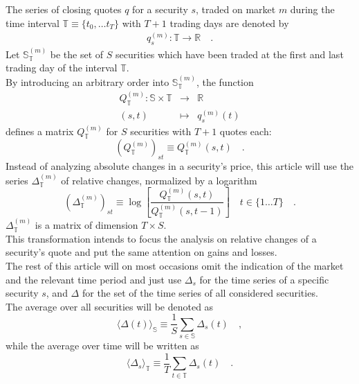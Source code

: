 \documentclass[11pt,twoside,a4paper]{article}
\numberwithin{equation}{section}
\numberwithin{figure}{section}
\numberwithin{table}{section}
\begin{document}
The series of closing quotes $q$ for a security $s$, traded on market $m$ during the time interval $\mathbb{T}\equiv\{t_0,\ldots t_T\}$ with $T+1$ trading days are denoted by
\begin{align}
q^{(m)}_{s}:\mathbb{T}\rightarrow\mathbb{R}\quad.
\label{eqDefQuoteSeries}
\end{align}
Let $\mathbb{S}^{(m)}_\mathbb{T}$ be the set of $S$ securities which have been traded at the first and last trading day of the interval $\mathbb{T}$.\\
By introducing an arbitrary order into $\mathbb{S}^{(m)}_\mathbb{T}$, the function
\begin{eqnarray}
Q^{(m)}_{\mathbb{T}}:\mathbb{S}\times\mathbb{T}&\rightarrow&\mathbb{R}\\
(s,t)&\mapsto&q^{(m)}_s(t)
\end{eqnarray}
defines a matrix $Q^{(m)}_{\mathbb{T}}$ for $S$ securities with $T+1$ quotes each:
\begin{equation}
(Q^{(m)}_{\mathbb{T}})_{st}\equiv Q^{(m)}_{\mathbb{T}}(s,t)\quad.
\end{equation}
Instead of analyzing absolute changes in a security's price, this article will use the series $\Delta^{(m)}_{\mathbb{T}}$ of relative changes, normalized by a logarithm 
\begin{equation}
\left(\Delta^{(m)}_{\mathbb{T}}\right)_{st} \equiv \log\left[\frac{Q^{(m)}_{\mathbb{T}}(s,t)}{Q^{(m)}_{\mathbb{T}}(s,t-1)}\right]\quad t\in\{1\ldots T\}\quad.
\end{equation}
$\Delta^{(m)}_{\mathbb{T}}$ is a matrix of dimension $T\times S$.\\

This transformation intends to focus the analysis on relative changes of a security's quote and put the same attention on gains and losses.\\
The rest of this article will on most occasions omit the indication of the market and the relevant time period and just use $\Delta_s$ for the time series of a specific security $s$, and $\Delta$ for the set of the time series of all considered securities.\\
The average over all securities will be denoted as
\begin{equation}
\langle\Delta(t)\rangle_\mathbb{S}\equiv\frac{1}{S}\sum_{s\in \mathbb{S}}\Delta_s(t)\quad,
\end{equation}
while the average over time will be written as
\begin{equation}
\langle\Delta_s\rangle_\mathbb{T}\equiv\frac{1}{T}\sum_{t\in \mathbb{T}}\Delta_s(t)\quad.
\end{equation}
\end{document}
